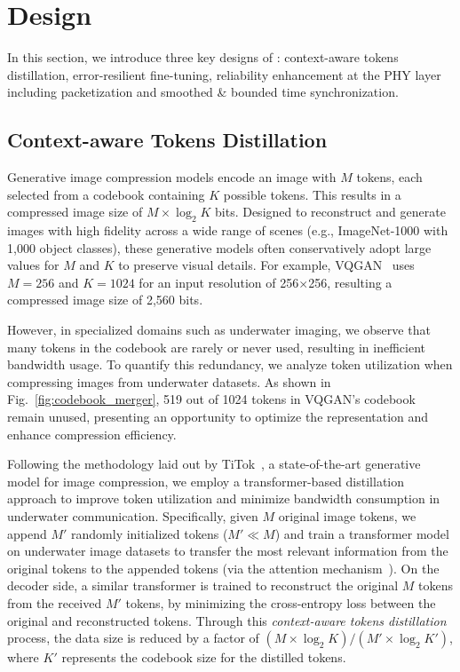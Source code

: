 
\section{\sysname Design}
\label{sec:systemdesign_transmission}
In this section, we introduce three key designs of \sysname:
context-aware tokens distillation, error-resilient fine-tuning, reliability enhancement at the PHY layer including packetization
and smoothed \& bounded time synchronization.




\subsection{Context-aware Tokens Distillation}
\label{sec:semantic_filtering}


Generative image compression models encode an image with $M$ tokens,
each selected from a codebook containing $K$ possible tokens.
This results in a compressed image size of $M\times \log_2 K$ bits.
Designed to reconstruct and generate images with high fidelity across
a wide range of scenes (e.g., ImageNet-1000 with 1,000 object classes),
these generative models often conservatively adopt large values for $M$ and $K$
to preserve visual details.
For example, VQGAN~\cite{mao2024extreme} uses $M=256$ and $K=1024$ for an input
resolution of 256$\times$256, resulting a compressed image size of 2,560 bits.


However, in specialized domains such as underwater imaging, we observe
that many tokens in the codebook are rarely or never used, resulting in
inefficient bandwidth usage.
To quantify this redundancy, we analyze token utilization when compressing
images from underwater datasets.
As shown in Fig.~\ref{fig:codebook_merger}, 519 out of 1024 tokens in VQGAN's
codebook remain unused, presenting an opportunity to optimize
the representation and enhance compression efficiency.


Following the methodology laid out by TiTok~\cite{yu2024image},
a state-of-the-art generative model for image compression,
we employ a transformer-based distillation approach to improve token utilization
and minimize bandwidth consumption in underwater communication.
Specifically, given $M$ original image tokens, we append $M'$ randomly initialized
tokens ($M' \ll M$) and train a transformer model on underwater image datasets
to transfer the most relevant information from the original tokens to the
appended tokens (via the attention
mechanism~\cite{touvron2021training}).
On the decoder side, a similar transformer is trained to reconstruct the
original $M$ tokens from the received $M'$ tokens, by minimizing the
cross-entropy loss between the original and reconstructed tokens.
Through this \emph{context-aware tokens distillation} process, the data size
is reduced by a factor of $(M \times \log_{2}K) / (M'\times \log_{2}K')$, where $K'$
represents the codebook size for the distilled tokens.





